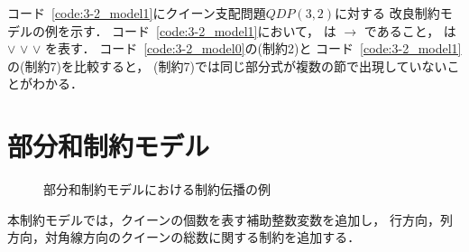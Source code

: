 コード~\ref{code:3-2_model1}にクイーン支配問題$QDP(3,2)$に対する
改良制約モデルの例を示す．
コード~\ref{code:3-2_model1}において，
  
は $\rightarrow$ 
   
であること，  
 は $\vee$ 
 $\vee$  $\vee$ を表す．
%
コード~\ref{code:3-2_model0}の(制約2)と
コード~\ref{code:3-2_model1}の(制約7)を比較すると，
(制約7)では同じ部分式が複数の節で出現していないことがわかる．

\section{部分和制約モデル}

\begin{figure}[ht]
 \begin{minipage}[b]{0.45\linewidth}
  \centering
  
 \end{minipage}
 \begin{minipage}[b]{0.45\linewidth}
  
 \end{minipage}
 \caption{部分和制約モデルにおける制約伝播の例}
 \label{fig:constraint}
\end{figure}



本制約モデルでは，クイーンの個数を表す補助整数変数を追加し，
行方向，列方向，対角線方向のクイーンの総数に関する制約を追加する．

